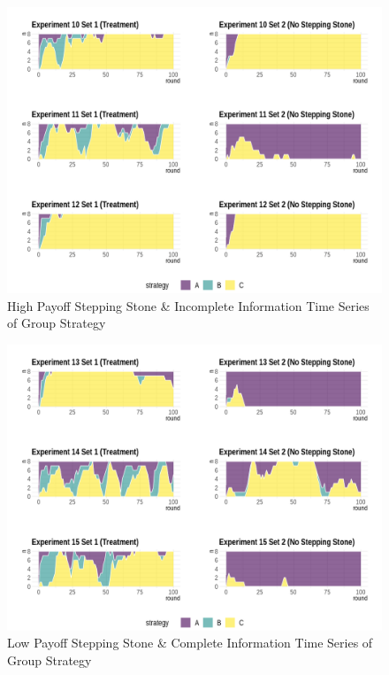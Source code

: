 \begin{figure}[h]
\captionsetup{justification=centering}
  \caption[caption]{High Payoff Stepping Stone \& Incomplete Information Time Series of Group Strategy}
   \label{fig:Series2I}
    \includegraphics[width = \textwidth]{Images/AllAreaPlot2I.png}
    
\end{figure}

\begin{figure}[h]
\captionsetup{justification=centering}
  \caption[caption]{Low Payoff Stepping Stone \& Complete Information Time Series of Group Strategy}
   \label{fig:Series3C}
    \includegraphics[width = \textwidth]{Images/AllAreaPlot3C.png}
    
\end{figure}

